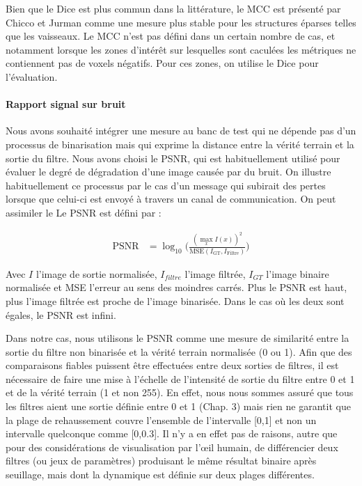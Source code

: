 Bien que le Dice est plus commun dans la littérature, le MCC est présenté par Chicco et Jurman \cite{Chicco2020_advantages_MCC_Dice} comme une mesure plus stable pour les structures éparses telles que les vaisseaux. Le MCC n'est pas défini dans un certain nombre de cas, et notamment lorsque les zones d'intérêt sur lesquelles sont caculées les métriques ne contiennent pas de voxels négatifs. Pour ces zones, on utilise le Dice pour l'évaluation. 


\paragraph{Rapport signal sur bruit}


Nous avons souhaité intégrer une mesure au banc de test qui ne dépende pas d'un processus de binarisation mais qui exprime la distance entre la vérité terrain et la sortie du filtre. Nous avons choisi le PSNR, qui est habituellement utilisé pour évaluer le degré de dégradation d'une image causée par du bruit. On illustre habituellement ce processus par le cas d'un message qui subirait des pertes lorsque que celui-ci est envoyé à travers un canal de communication. On peut assimiler le  Le PSNR est défini par :

\begin{align}%
 \nonumber
  \textrm{PSNR} & = \log_{10}\Big( \frac{ (\max_x I(x))^2  }{ \textrm{MSE}( I_{\textrm{GT}}, I_{\textrm{Filtre}} ) } \Big)
\end{align}

Avec $I$ l'image de sortie normalisée, $I_{filtre}$ l'image filtrée, $I_{GT}$ l'image binaire normalisée et MSE l'erreur au sens des moindres carrés. Plus le PSNR est haut, plus l'image filtrée est proche de l'image binarisée. Dans le cas où les deux sont égales, le PSNR est infini.

Dans notre cas, nous utilisons le PSNR comme une mesure de similarité entre la sortie du filtre non binarisée et la vérité terrain normalisée (0 ou 1). Afin que des comparaisons fiables puissent être effectuées entre deux sorties de filtres, il est nécessaire de faire une mise à l'échelle de l'intensité de sortie du filtre entre 0 et 1 et de la vérité terrain (1 et non 255). En effet, nous nous sommes assuré que tous les filtres aient une sortie définie entre 0 et 1 (Chap. 3) mais rien ne garantit que la plage de rehaussement couvre l'ensemble de l'intervalle [0,1] et non un intervalle quelconque comme [0,0.3]. Il n'y a en effet pas de raisons, autre que pour des considérations de visualisation par l'œil humain, de différencier deux filtres (ou jeux de paramètres) produisant le même résultat binaire après seuillage, mais dont la dynamique est définie sur deux plages différentes.

